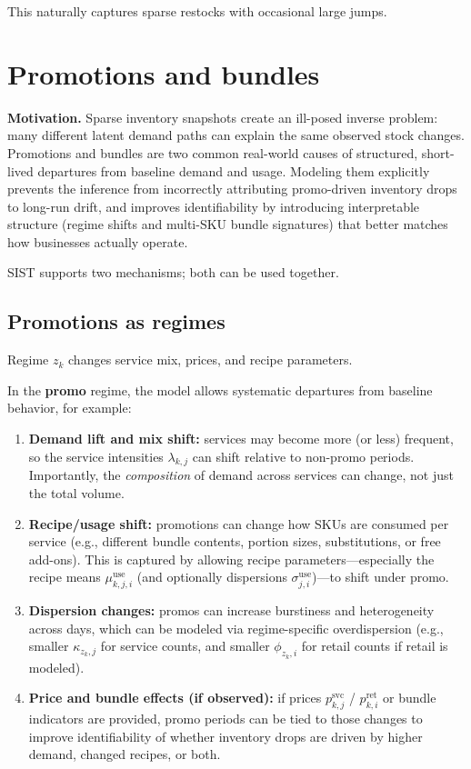 \documentclass[11pt]{article}
\begin{document}
This naturally captures sparse restocks with occasional large jumps.

\section{Promotions and bundles}

\textbf{Motivation.} Sparse inventory snapshots create an ill-posed inverse problem: many different latent demand paths can explain the same observed stock changes.
Promotions and bundles are two common real-world causes of structured, short-lived departures from baseline demand and usage.
Modeling them explicitly prevents the inference from incorrectly attributing promo-driven inventory drops to long-run drift, and improves identifiability by introducing interpretable structure (regime shifts and multi-SKU bundle signatures) that better matches how businesses actually operate.

SIST supports two mechanisms; both can be used together.

\subsection{Promotions as regimes}

Regime $z_k$ changes service mix, prices, and recipe parameters.

In the \textbf{promo} regime, the model allows systematic departures from baseline behavior, for example:
\begin{enumerate}
  \item \textbf{Demand lift and mix shift:} services may become more (or less) frequent, so the service intensities $\lambda_{k,j}$ can shift relative to non-promo periods. Importantly, the \emph{composition} of demand across services can change, not just the total volume.

  \item \textbf{Recipe/usage shift:} promotions can change how SKUs are consumed per service (e.g., different bundle contents, portion sizes, substitutions, or free add-ons). This is captured by allowing recipe parameters---especially the recipe means $\mu^{\mathrm{use}}_{k,j,i}$ (and optionally dispersions $\sigma^{\mathrm{use}}_{j,i}$)---to shift under promo.

  \item \textbf{Dispersion changes:} promos can increase burstiness and heterogeneity across days, which can be modeled via regime-specific overdispersion (e.g., smaller $\kappa_{z_k,j}$ for service counts, and smaller $\phi_{z_k,i}$ for retail counts if retail is modeled).

  \item \textbf{Price and bundle effects (if observed):} if prices $p^{\mathrm{svc}}_{k,j}$ / $p^{\mathrm{ret}}_{k,i}$ or bundle indicators are provided, promo periods can be tied to those changes to improve identifiability of whether inventory drops are driven by higher demand, changed recipes, or both.
\end{enumerate}
\end{document}
